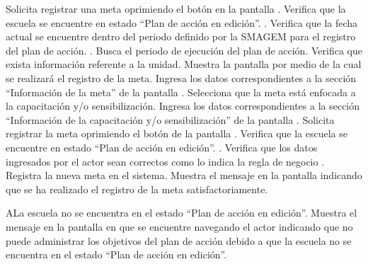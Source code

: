  
\begin{UCtrayectoria}
	\UCpaso[\UCactor] Solicita registrar una meta oprimiendo el botón  en la pantalla .
	\UCpaso[\UCsist] Verifica que la escuela se encuentre en  estado ``Plan de acción en edición''. .
    \UCpaso[\UCsist] Verifica que la fecha actual se encuentre dentro del periodo definido por la SMAGEM para el registro del plan de acción. .	
	\UCpaso[\UCsist] Busca el periodo de ejecución del plan de acción.
	\UCpaso[\UCsist] Verifica que exista información referente a la unidad. 
	\UCpaso[\UCsist] Muestra la pantalla  por medio de la cual se realizará el registro de la meta.
	\UCpaso[\UCactor] Ingresa los datos correspondientes a la sección ``Información de la meta'' de la pantalla . \label{cupl1:ingresaDatos}
	\UCpaso[\UCactor] Selecciona que la meta está enfocada a la capacitación y/o sensibilización. 
	\UCpaso[\UCactor] Ingresa los datos correspondientes a la sección ``Información de la capacitación y/o sensibilización'' de la pantalla .
	\UCpaso[\UCactor] Solicita registrar la meta oprimiendo el botón  de la pantalla .  \label{cupl1:oprimeAceptar}
\UCpaso[\UCsist] Verifica que la escuela se encuentre en  estado ``Plan de acción en edición''. .	
	\UCpaso[\UCsist] Verifica que los datos ingresados por el actor sean correctos como lo indica la regla de negocio .   
	\UCpaso[\UCsist] Registra la nueva meta en el sistema.
	\UCpaso[\UCsist] Muestra el mensaje  en la pantalla  indicando que se ha realizado el registro de la meta satisfactoriamente.
\end{UCtrayectoria}
 
 
 \begin{UCtrayectoriaA}{A}{La escuela no se encuentra en el estado ``Plan de acción en edición''.}
    \UCpaso[\UCsist] Muestra el mensaje  en la pantalla en que se encuentre navegando el actor indicando que no puede administrar los objetivos del plan de acción debido a que la escuela no se encuentra en el estado ``Plan de acción en edición''. 
 \end{UCtrayectoriaA}
 

